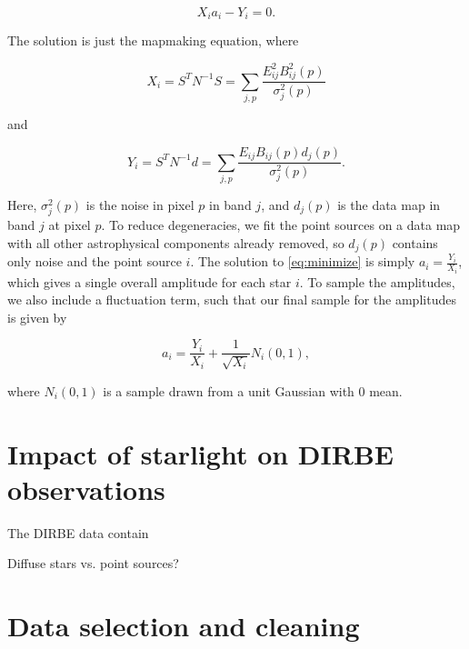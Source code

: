 \documentclass{aa}
\begin{document}
\begin{equation}
\label{eq:minimize}
X_ia_i - Y_i = 0.
\end{equation}

The solution is just the mapmaking equation, where

\begin{equation}
X_i = S^T N^{-1} S = \sum_{j,p}\frac{E_{ij}^2 B^2_{ij}(p)}{\sigma_j^2(p)} 
\end{equation}

and

\begin{equation}
Y_i = S^TN^{-1}d = \sum_{j,p} \frac{E_{ij}B_{ij}(p) d_j(p)}{\sigma_j^2(p)}.
\end{equation}

Here, $\sigma_j^2(p)$ is the noise in pixel $p$ in band $j$, and $d_j(p)$ is the data map in band $j$ at pixel $p$. To reduce degeneracies, we fit the point sources on a data map with all other astrophysical components already removed, so $d_j(p)$ contains only noise and the point source $i$. The solution to \ref{eq:minimize} is simply $a_i = \frac{Y_i}{X_i}$, which gives a single overall amplitude for each star $i$. To sample the amplitudes, we also include a fluctuation term, such that our final sample for the amplitudes is given by

\begin{equation}
a_i = \frac{Y_i}{X_i} + \frac{1}{\sqrt{X_i}} N_i(0,1),
\end{equation}

where $N_i(0,1)$ is a sample drawn from a unit Gaussian with 0 mean.


\section{Impact of starlight on DIRBE observations}
\label{sec:impact}

The DIRBE data contain 


Diffuse stars vs. point sources? 



\clearpage
\section{Data selection and cleaning}
\label{sec:data}
\end{document}
